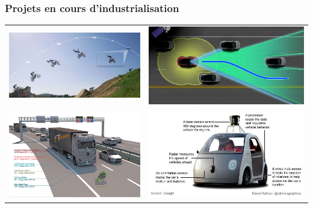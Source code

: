 \documentclass{beamer}
\begin{document}
\begin{frame}
\frametitle{Projets en cours d'industrialisation}
\begin{tabular}{r l}
 \includegraphics[width=0.5\linewidth]{img/dronetracking.jpg} &
 \includegraphics[width=0.5\linewidth]{img/tesla.jpg} \\
 \includegraphics[width=0.5\linewidth]{img/selfdrivingtruck.jpg} &
 \includegraphics[width=0.5\linewidth]{img/googlecar.jpg} 
\end{tabular}
\end{frame}

\end{document}
